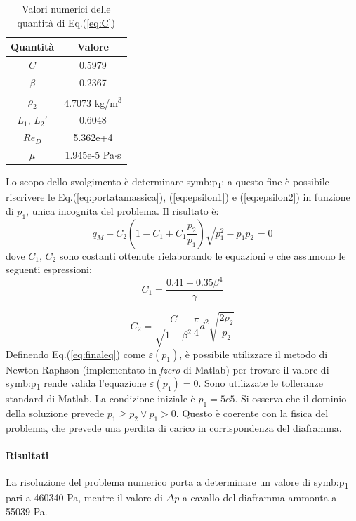 \begin{table}[H]
	\centering
	\begin{tabular}{c|c}
		\toprule
		\toprule
		\textbf{Quantità} & \textbf{Valore}\\
		\midrule
		\midrule
		$C$ & 0.5979\\
		\midrule
		$\beta$ & 0.2367\\
		\midrule
		$\rho_2$ & 4.7073 kg/m\textsuperscript{3}\\
		\midrule
		$L_1,\,L_2'$ & 0.6048\\
		\midrule
		$Re_D$ & 5.362e+4\\
		\midrule
		$\mu$ & 1.945e-5 Pa$\cdot$s\\
		\bottomrule
		\bottomrule
	\end{tabular}
\caption{Valori numerici delle quantità di Eq.(\ref{eq:C})}
\label{tab:valoriC}
\end{table}

Lo scopo dello svolgimento è determinare \gls{symb:p}\textsubscript{1}: a questo fine è possibile riscrivere le Eq.(\ref{eq:portatamassica}), (\ref{eq:epsilon1}) e (\ref{eq:epsilon2}) in funzione di $p_1$, unica incognita del problema. 
Il risultato è:
\begin{equation}
	q_M-C_2(1-C_1+C_1 \frac{p_2}{p_1}) \sqrt{p_1^2-p_1 p_2}=0 \label{eq:finaleq}
\end{equation}
dove $ C_1,\, C_2$ sono costanti ottenute rielaborando le equazioni e che assumono le seguenti espressioni:
\begin{equation}
	C_1 = \frac{0.41 + 0.35 \beta^4}{\gamma}
\end{equation}

\begin{equation}
		C_2 = \frac{C}{\sqrt{1-\beta^2}} \frac{\pi}{4} d^2 \sqrt{\frac{2 \rho_2}{p_2}}
\end{equation}
Definendo Eq.(\ref{eq:finaleq}) come $\varepsilon (p_1) $, è possibile utilizzare il metodo di Newton-Raphson (implementato in \textit{fzero} di Matlab) per trovare il valore di \gls{symb:p}\textsubscript{1} rende valida l'equazione $\varepsilon (p_1) = 0$. Sono utilizzate le tolleranze standard di Matlab. La condizione iniziale è $p_1 = 5e5$. Si osserva che il dominio della soluzione prevede $p_1 \geqslant p_2 \vee p_1 > 0$. Questo è coerente con la fisica del problema, che prevede una perdita di carico in corrispondenza del diaframma. 

\paragraph{Risultati}
La risoluzione del problema numerico porta a determinare un valore di \gls{symb:p}\textsubscript{1} pari a 460340 Pa, mentre il valore di $\Delta p$ a cavallo del diaframma ammonta a 55039 Pa. 

